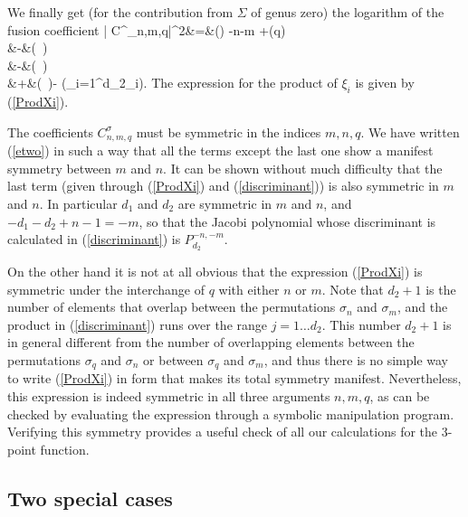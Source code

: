 \documentclass[12pt]{article}
\begin{document}
We finally get   (for the contribution from $\Sigma$ of genus zero) 
the logarithm of the fusion
coefficient
\bea
\log| C^\sigma_{n,m,q}|^2&=&\log\left(\right)
-\log n-\log m +\log(q)
\nonumber\\
&-&\log\left(\
\right)\\
&-&\log\left(\
\right)\nonumber\\
&+&\frac{q{-}1}{12q}\log\left(\
\right)-
\frac{1}{6}\log\left(\prod_{i=1}^{d_2}\xi_i\right).\nonumber
\label{etwo}
\eea
The expression for the product of $\xi_i$ is given by (\ref{ProdXi}).

   The coefficients  $C^\sigma_{n,m,q}$ must be symmetric in the indices
$m,n,q$. We have written (\ref{etwo}) in such a way
that all the terms except the last one show a manifest symmetry
between $m$ and $n$. It can be shown without much difficulty
that the last term (given through (\ref{ProdXi}) and (\ref{discriminant}))
is also symmetric in $m$ and $n$. In
particular $d_1$ and $d_2$ are symmetric  in $m$ and $n$, and
$-d_1-d_2+n-1=-m$, so that the Jacobi polynomial whose
discriminant is calculated in  (\ref{discriminant}) is $P^{-n, -m}_{d_2}$.

On the other hand it is not at all obvious that the expression
(\ref{ProdXi}) is symmetric under the interchange of $q$ with
either $n$ or $m$. Note that $d_2+1$ is the number of elements that
overlap between the permutations $\sigma_n$ and
$\sigma_m$, and the product in  (\ref{discriminant}) runs over the
range $j=1\dots d_2$. This number $d_2+1$ is in general
different from the number of overlapping elements between the
permutations $\sigma_q$ and
$\sigma_n$ or between $\sigma_q$ and
$\sigma_m$, and thus there is no simple way to write (\ref{ProdXi})
in form that makes its total symmetry manifest.
Nevertheless, this expression is indeed symmetric in all three
arguments $n,m,q$, as can be checked by evaluating the
expression through a symbolic manipulation program. Verifying this
symmetry provides a useful check of all our
calculations for the 3-point function.

\subsection{Two special cases}
\end{document}
